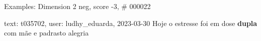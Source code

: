 \begin{frame}{Examples: Dimension 2 neg, score -3, \# 000022}
\footnotesize
\begin{alertblock}{text: t035702, user: ludhy\_eduarda, 2023-03-30}
Hoje o estresse foi em dose \textbf{dupla} com mãe e padrasto 
  
alegria  
\textbf{}  
\end{alertblock}
\end{frame}
